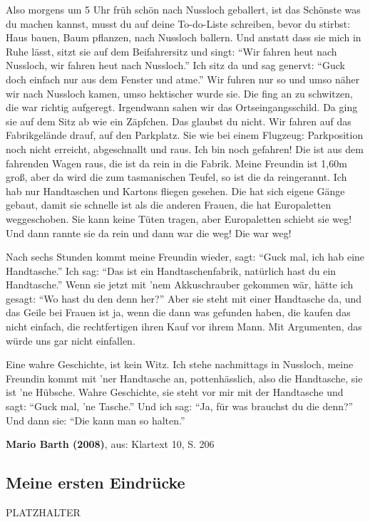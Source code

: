 \documentclass[12pt,a4paper]{scrartcl}
\begin{document}
\begin{linenumbers}
Also morgens um 5 Uhr früh schön nach Nussloch geballert, ist das Schönste was du machen kannst, musst du auf deine To-do-Liste schreiben, bevor du stirbst: Haus bauen, Baum pflanzen, nach Nussloch ballern. Und anstatt dass sie mich in Ruhe lässt, sitzt sie auf dem Beifahrersitz und singt: "`Wir fahren heut nach Nussloch, wir fahren heut nach Nussloch."' Ich sitz da und sag genervt: "`Guck doch einfach nur aus dem Fenster und atme."' Wir fuhren nur so und umso näher wir nach Nussloch kamen, umso hektischer wurde sie. Die fing an zu schwitzen, die war richtig aufgeregt. Irgendwann sahen wir das Ortseingangsschild. Da ging sie auf dem Sitz ab wie ein Zäpfchen. Das glaubst du nicht. Wir fahren auf das Fabrikgelände drauf, auf den Parkplatz. Sie wie bei einem Flugzeug: Parkposition noch nicht erreicht, abgeschnallt und raus. Ich bin noch gefahren! Die ist aus dem fahrenden Wagen raus, die ist da rein in die Fabrik. Meine Freundin ist 1,60m groß, aber da wird die zum tasmanischen Teufel, so ist die da reingerannt. Ich hab nur Handtaschen und Kartons fliegen gesehen. Die hat sich eigene Gänge gebaut, damit sie schnelle ist als die anderen Frauen, die hat Europaletten weggeschoben. Sie kann keine Tüten tragen, aber Europaletten schiebt sie weg! Und dann rannte sie da rein und dann war die weg! Die war weg!

Nach sechs Stunden kommt meine Freundin wieder, sagt: "`Guck mal, ich hab eine Handtasche."' Ich sag: "`Das ist ein Handtaschenfabrik, natürlich hast du ein Handtasche."' Wenn sie jetzt mit 'nem Akkuschrauber gekommen wär, hätte ich gesagt: "`Wo hast du den denn her?"' Aber sie steht mit einer Handtasche da, und das Geile bei Frauen ist ja, wenn die dann was gefunden haben, die kaufen das nicht einfach, die rechtfertigen ihren Kauf vor ihrem Mann. Mit Argumenten, das würde uns gar nicht einfallen.

Eine wahre Geschichte, ist kein Witz. Ich stehe nachmittags in Nussloch, meine Freundin kommt mit 'ner Handtasche an, pottenhässlich, also die Handtasche, sie ist 'ne Hübsche. Wahre Geschichte, sie steht vor mir mit der Handtasche und sagt: "`Guck mal, 'ne Tasche."' Und ich sag: "`Ja, für was brauchst du die denn?"'  Und dann sie: "`Die kann man so halten."'
\end{linenumbers}
\textbf{Mario Barth (2008)}, aus: Klartext 10, S. 206
\subsection{Meine ersten Eindrücke} 
PLATZHALTER
\end{document}
